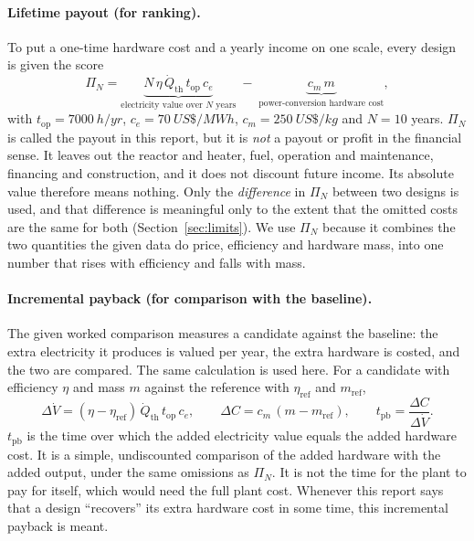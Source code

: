 \paragraph{Lifetime payout (for ranking).} To put a one-time hardware cost and a yearly income on one scale, every design is given the score
\begin{equation}
\Pi_N = \underbrace{N \,\eta\, \dot Q_\mathrm{th}\, t_\mathrm{op}\, c_e}_{\text{electricity value over } N \text{ years}} \;-\; \underbrace{c_m\, m}_{\text{power-conversion hardware cost}},
\end{equation}
with $t_\mathrm{op} = \SI{7000}{h/yr}$, $c_e = \SI{70}{US\$/MWh}$, $c_m = \SI{250}{US\$/kg}$ and $N = 10$ years. $\Pi_N$ is called the payout in this report, but it is \emph{not} a payout or profit in the financial sense. It leaves out the reactor and heater, fuel, operation and maintenance, financing and construction, and it does not discount future income. Its absolute value therefore means nothing. Only the \emph{difference} in $\Pi_N$ between two designs is used, and that difference is meaningful only to the extent that the omitted costs are the same for both (Section~\ref{sec:limits}). We use $\Pi_N$ because it combines the two quantities the given data do price, efficiency and hardware mass, into one number that rises with efficiency and falls with mass.

\paragraph{Incremental payback (for comparison with the baseline).} The given worked comparison measures a candidate against the baseline: the extra electricity it produces is valued per year, the extra hardware is costed, and the two are compared. The same calculation is used here. For a candidate with efficiency $\eta$ and mass $m$ against the reference with $\eta_\mathrm{ref}$ and $m_\mathrm{ref}$,
\begin{equation}
\Delta \dot V = (\eta - \eta_\mathrm{ref})\,\dot Q_\mathrm{th}\, t_\mathrm{op}\, c_e, \qquad
\Delta C = c_m\,(m - m_\mathrm{ref}), \qquad
t_\mathrm{pb} = \frac{\Delta C}{\Delta \dot V}.
\end{equation}
$t_\mathrm{pb}$ is the time over which the added electricity value equals the added hardware cost. It is a simple, undiscounted comparison of the added hardware with the added output, under the same omissions as $\Pi_N$. It is not the time for the plant to pay for itself, which would need the full plant cost. Whenever this report says that a design ``recovers'' its extra hardware cost in some time, this incremental payback is meant.

